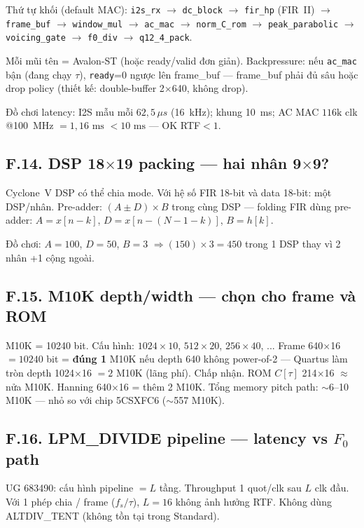 Thứ tự khối (default MAC):
\texttt{i2s\_rx} $\to$ \texttt{dc\_block} $\to$ \texttt{fir\_hp} (FIR~II) $\to$ \texttt{frame\_buf} $\to$ \texttt{window\_mul} $\to$ \texttt{ac\_mac} $\to$ \texttt{norm\_C\_rom} $\to$ \texttt{peak\_parabolic} $\to$ \texttt{voicing\_gate} $\to$ \texttt{f0\_div} $\to$ \texttt{q12\_4\_pack}.

Mỗi mũi tên = Avalon-ST (hoặc ready/valid đơn giản). Backpressure: nếu \texttt{ac\_mac} bận (đang chạy $\tau$), \texttt{ready}=0 ngược lên frame\_buf --- frame\_buf phải đủ sâu hoặc drop policy (thiết kế: double-buffer 2$\times$640, không drop).

Đồ chơi latency: I2S mẫu mỗi $62{,}5\,\mu s$ (16~kHz); khung 10~ms; AC MAC $116\text{k}$ clk @100~MHz $=1{,}16\text{ ms}$ $<10\text{ ms}$ --- OK RTF$<1$.

\subsection*{F.14. DSP 18$\times$19 packing --- hai nhân 9$\times$9?}

Cyclone~V DSP có thể chia mode. Với hệ số FIR 18-bit và data 18-bit: một DSP/nhân. Pre-adder: $(A\pm D)\times B$ trong cùng DSP --- folding FIR dùng pre-adder: $A=x[n-k]$, $D=x[n-(N-1-k)]$, $B=h[k]$.

Đồ chơi: $A=100$, $D=50$, $B=3$ $\Rightarrow (150)\times3=450$ trong 1 DSP thay vì 2 nhân +1 cộng ngoài.

\subsection*{F.15. M10K depth/width --- chọn cho frame và ROM}

M10K = 10240 bit. Cấu hình: $1024\times10$, $512\times20$, $256\times40$, ...
Frame 640$\times$16 $=10240$ bit = \textbf{đúng 1} M10K nếu depth 640 không power-of-2 --- Quartus làm tròn depth 1024$\times$16 $=2$ M10K (lãng phí). Chấp nhận. ROM $C[\tau]$ 214$\times$16 $\approx$ nửa M10K. Hanning 640$\times$16 = thêm 2 M10K. Tổng memory pitch path: $\sim$6--10 M10K --- nhỏ so với chip 5CSXFC6 ($\sim$557 M10K).

\subsection*{F.16. LPM\_DIVIDE pipeline --- latency vs $F_0$ path}

UG 683490: cấu hình pipeline $=L$ tầng. Throughput 1 quot/clk sau $L$ clk đầu. Với 1 phép chia / frame ($f_s/\tau$), $L=16$ không ảnh hưởng RTF. Không dùng ALTDIV\_TENT (không tồn tại trong Standard).

